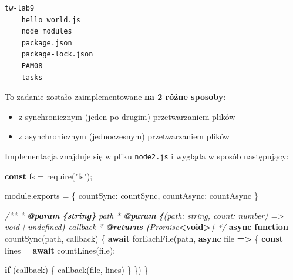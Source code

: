 \documentclass[11pt]{article}
\providecommand{\tightlist}{%
      \setlength{\itemsep}{0pt}\setlength{\parskip}{0pt}}
\newenvironment{Shaded}{}{}
\newcommand{\KeywordTok}[1]{\textcolor[rgb]{0.00,0.44,0.13}{\textbf{{#1}}}}
\newcommand{\DataTypeTok}[1]{\textcolor[rgb]{0.56,0.13,0.00}{{#1}}}
\newcommand{\StringTok}[1]{\textcolor[rgb]{0.25,0.44,0.63}{{#1}}}
\newcommand{\CommentTok}[1]{\textcolor[rgb]{0.38,0.63,0.69}{\textit{{#1}}}}
\newcommand{\FunctionTok}[1]{\textcolor[rgb]{0.02,0.16,0.49}{{#1}}}
\newcommand{\NormalTok}[1]{{#1}}
\newcommand{\AnnotationTok}[1]{\textcolor[rgb]{0.38,0.63,0.69}{\textbf{\textit{{#1}}}}}
\newcommand{\CommentVarTok}[1]{\textcolor[rgb]{0.38,0.63,0.69}{\textbf{\textit{{#1}}}}}
\newcommand{\ControlFlowTok}[1]{\textcolor[rgb]{0.00,0.44,0.13}{\textbf{{#1}}}}
\newcommand{\OperatorTok}[1]{\textcolor[rgb]{0.40,0.40,0.40}{{#1}}}
\newcommand{\PreprocessorTok}[1]{\textcolor[rgb]{0.74,0.48,0.00}{{#1}}}
\newcommand{\AttributeTok}[1]{\textcolor[rgb]{0.49,0.56,0.16}{{#1}}}
\begin{document}
\begin{verbatim}
tw-lab9
    hello_world.js
    node_modules
    package.json
    package-lock.json
    PAM08
    tasks
\end{verbatim}

To zadanie zostało zaimplementowane \textbf{na 2 różne sposoby}:

\begin{itemize}
\tightlist
\item
  z synchronicznym (jeden po drugim) przetwarzaniem plików
\item
  z asynchronicznym (jednoczesnym) przetwarzaniem plików
\end{itemize}

    Implementacja znajduje się w pliku \texttt{node2.js} i wygląda w sposób
następujący:

\begin{Shaded}
\begin{Highlighting}[]
\KeywordTok{const}\NormalTok{ fs }\OperatorTok{=} \PreprocessorTok{require}\NormalTok{(}\StringTok{"fs"}\NormalTok{)}\OperatorTok{;}

\NormalTok{module}\OperatorTok{.}\AttributeTok{exports} \OperatorTok{=}\NormalTok{ \{}
    \DataTypeTok{countSync}\OperatorTok{:}\NormalTok{ countSync}\OperatorTok{,}
    \DataTypeTok{countAsync}\OperatorTok{:}\NormalTok{ countAsync}
\NormalTok{\}}

\CommentTok{/**}
\CommentTok{ * }\AnnotationTok{@param}\CommentTok{ }\CommentVarTok{\{string\}}\CommentTok{ path }
\CommentTok{ * }\AnnotationTok{@param}\CommentTok{ }\CommentVarTok{\{}\CommentTok{(path: string, count: number) =\textgreater{} void | undefined\} callback }
\CommentTok{ * }\AnnotationTok{@returns}\CommentTok{ \{Promise}\KeywordTok{\textless{}void\textgreater{}}\CommentTok{\}}
\CommentTok{ */}
\KeywordTok{async} \KeywordTok{function} \FunctionTok{countSync}\NormalTok{(path}\OperatorTok{,}\NormalTok{ callback) \{}
    \ControlFlowTok{await} \FunctionTok{forEachFile}\NormalTok{(path}\OperatorTok{,} \KeywordTok{async}\NormalTok{ file }\KeywordTok{=\textgreater{}}\NormalTok{ \{}
        \KeywordTok{const}\NormalTok{ lines }\OperatorTok{=} \ControlFlowTok{await} \FunctionTok{countLines}\NormalTok{(file)}\OperatorTok{;}

        \ControlFlowTok{if}\NormalTok{ (callback) \{}
            \FunctionTok{callback}\NormalTok{(file}\OperatorTok{,}\NormalTok{ lines)}
\NormalTok{        \}}
\NormalTok{    \})}
\NormalTok{\}}


\end{Highlighting}
\end{Shaded}
\end{document}
